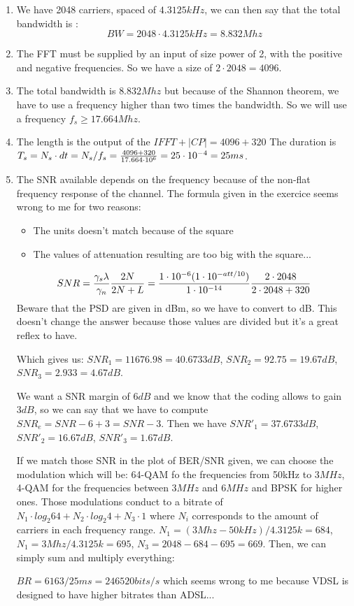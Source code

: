
\begin{solution}
	\begin{enumerate}
		\item We have 2048 carriers, spaced of $4.3125kHz$, we can then say that the total bandwidth is : 
			  $$BW = 2048\cdot 4.3125kHz = 8.832 Mhz$$
		\item The FFT must be supplied by an input of size power of 2, with the positive and negative frequencies. So we have a size of $2\cdot 2048 = 4096$.
		\item The total bandwidth is $8.832 Mhz$ but because of the Shannon theorem, we have to use a frequency higher than two times the bandwidth. So we will use a frequency $f_s \geq 17.664Mhz$.
		\item The length is the output of the $IFFT + |CP| = 4096 + 320$ The duration is $T_s = N_s \cdot dt = N_s/f_s = \frac{4096 + 320}{17.664\cdot 10^{6}} = 25\cdot 10^{-4} = 25ms$.
		\item The SNR available depends on the frequency because of the non-flat frequency response of the channel. The formula given in the exercice seems wrong to me for two reasons:
		\begin{itemize}
			\item The units doesn't match because of the square
			\item The values of attenuation resulting are too big with the square...
		\end{itemize}				
		
		$$
		SNR = \frac{\gamma_s \lambda}{\gamma_n}\frac{2N}{2N + L} = \frac{1\cdot 10^{-6} (1\cdot 10^{-att/10})}{1\cdot 10^{-14}}\frac{2\cdot 2048}{2\cdot 2048 + 320}
		$$
		Beware that the PSD are given in dBm, so we have to convert to dB. This doesn't change the answer because those values are divided but it's a great reflex to have.
		
		
		Which gives us: $SNR_{1} = 11676.98 = 40.6733 dB$, $SNR_{2} = 92.75 = 19.67 dB$, $SNR_{3} = 2.933 = 4.67 dB$.
		
		We want a SNR margin of $6dB$ and we know that the coding allows to gain $3dB$, so we can say that we have to compute $SNR_e = SNR - 6 + 3 = SNR - 3$.
		Then we have $SNR'_{1} = 37.6733 dB$, $SNR'_{2} = 16.67 dB$, $SNR'_{3} = 1.67 dB$.
		
		If we match those SNR in the plot of BER/SNR given, we can choose the modulation which will be: 64-QAM fo the frequencies from 50kHz to $3MHz$, 4-QAM for the frequencies between $3MHz$ and $6MHz$ and BPSK for higher ones.
		Those modulations conduct to a bitrate of $N_1\cdot log_2 64 + N_2\cdot log_2 4 + N_3\cdot 1$ where $N_i$ corresponds to the amount of carriers in each frequency range. 
		$N_1 = (3Mhz - 50kHz)/4.3125k = 684$, $N_1 = 3Mhz/4.3125k = 695$, $N_3 = 2048 - 684 - 695 = 669$. Then, we can simply sum and multiply everything:
		
		
		$BR = 6163/25ms = 246520 bits/s$ which seems wrong to me because VDSL is designed to have higher bitrates than ADSL... \notsure	
						
	\end{enumerate}
\end{solution}

